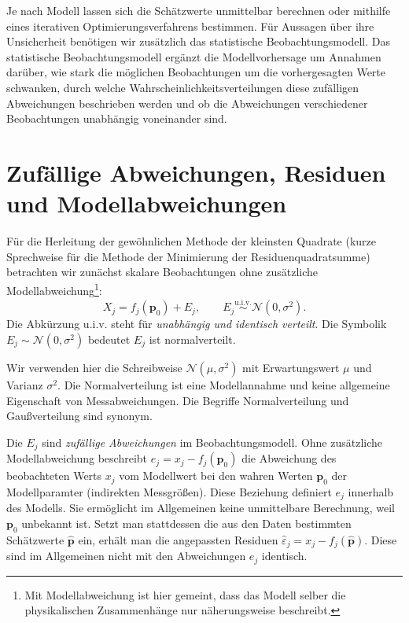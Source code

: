 Je nach Modell lassen sich die Schätzwerte unmittelbar berechnen oder
mithilfe eines iterativen Optimierungsverfahrens bestimmen.
Für Aussagen über ihre Unsicherheit benötigen wir zusätzlich das
statistische Beobachtungsmodell. Das statistische Beobachtungsmodell ergänzt die Modellvorhersage um Annahmen darüber, wie stark die möglichen Beobachtungen um die vorhergesagten Werte schwanken, durch welche Wahrscheinlichkeitsverteilungen diese zufälligen Abweichungen beschrieben werden und ob die Abweichungen verschiedener Beobachtungen unabhängig voneinander sind.

\section{Zufällige Abweichungen, Residuen und Modellabweichungen}
\label{V4Abweichungen}

Für die Herleitung der gewöhnlichen \glqq Methode der kleinsten Quadrate\grqq{} (kurze Sprechweise für die Methode der Minimierung der Residuenquadratsumme) betrachten wir zunächst skalare Beobachtungen ohne zusätzliche Modellabweichung\footnote{Mit Modellabweichung ist hier gemeint, dass das Modell selber die physikalischen Zusammenhänge nur näherungsweise beschreibt.}:
\begin{equation}
X_j=f_j(\mathbf{p}_0)+E_j,
\qquad E_j\overset{\mathrm{u.i.v.}}{\sim}\mathcal{N}(0,\sigma^2).
\label{KonzepteSkalaresModell}
\end{equation}
Die Abkürzung u.i.v. steht für \textsl{unabhängig und identisch verteilt}. Die Symbolik $E_j\sim\mathcal{N}(0,\sigma^2)$ bedeutet \glqq $E_j$ ist normalverteilt\grqq.

Wir verwenden hier die Schreibweise $\mathcal{N}(\mu,\sigma^2)$ mit
Erwartungswert $\mu$ und Varianz $\sigma^2$.
Die Normalverteilung ist eine Modellannahme und keine allgemeine
Eigenschaft von Messabweichungen. Die Begriffe Normalverteilung und
Gaußverteilung sind synonym.

Die $E_j$ sind \textsl{zufällige Abweichungen} im Beobachtungsmodell.
Ohne zusätzliche Modellabweichung beschreibt
$e_j=x_j-f_j(\mathbf p_0)$ die Abweichung des beobachteten Werts $x_j$
vom Modellwert bei den wahren Werten $\mathbf p_0$ der Modellparamter (indirekten Messgrößen).
Diese Beziehung definiert $e_j$ innerhalb des Modells. Sie ermöglicht
im Allgemeinen keine unmittelbare Berechnung, weil $\mathbf p_0$
unbekannt ist. Setzt man stattdessen die aus den Daten bestimmten
Schätzwerte $\widehat{\mathbf p}$ ein, erhält man die angepassten
Residuen $\widehat{\varepsilon}_j=x_j-f_j(\widehat{\mathbf p})$.
Diese sind im Allgemeinen nicht mit den Abweichungen $e_j$ identisch.

